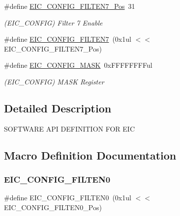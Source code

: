 \begin{DoxyCompactItemize}
\item 
\#define \mbox{\hyperlink{group___s_a_m_d21___e_i_c_ga77bd3664d9f1c1d6b212eac416d40341}{E\+I\+C\+\_\+\+C\+O\+N\+F\+I\+G\+\_\+\+F\+I\+L\+T\+E\+N7\+\_\+\+Pos}}~31
\begin{DoxyCompactList}\small\item\em (E\+I\+C\+\_\+\+C\+O\+N\+F\+IG) Filter 7 Enable \end{DoxyCompactList}\item 
\#define \mbox{\hyperlink{group___s_a_m_d21___e_i_c_gac996c8f278ab9f4af7588a785eef8c04}{E\+I\+C\+\_\+\+C\+O\+N\+F\+I\+G\+\_\+\+F\+I\+L\+T\+E\+N7}}~(0x1ul $<$$<$ E\+I\+C\+\_\+\+C\+O\+N\+F\+I\+G\+\_\+\+F\+I\+L\+T\+E\+N7\+\_\+\+Pos)
\item 
\#define \mbox{\hyperlink{group___s_a_m_d21___e_i_c_ga713278aaffe59a230cb4f7642ee4900e}{E\+I\+C\+\_\+\+C\+O\+N\+F\+I\+G\+\_\+\+M\+A\+SK}}~0x\+F\+F\+F\+F\+F\+F\+F\+Ful
\begin{DoxyCompactList}\small\item\em (E\+I\+C\+\_\+\+C\+O\+N\+F\+IG) M\+A\+SK Register \end{DoxyCompactList}\end{DoxyCompactItemize}


\subsection{Detailed Description}
S\+O\+F\+T\+W\+A\+RE A\+PI D\+E\+F\+I\+N\+I\+T\+I\+ON F\+OR E\+IC 

\subsection{Macro Definition Documentation}
\mbox{\label{group___s_a_m_d21___e_i_c_gaf3dda3c75f2f02a4d4c532526cc29230}} 
\subsubsection{\texorpdfstring{EIC\_CONFIG\_FILTEN0}{EIC\_CONFIG\_FILTEN0}}
{\footnotesize\ttfamily \#define E\+I\+C\+\_\+\+C\+O\+N\+F\+I\+G\+\_\+\+F\+I\+L\+T\+E\+N0~(0x1ul $<$$<$ E\+I\+C\+\_\+\+C\+O\+N\+F\+I\+G\+\_\+\+F\+I\+L\+T\+E\+N0\+\_\+\+Pos)}

\mbox{\label{group___s_a_m_d21___e_i_c_gaa17527a9aab80477ff20ed73d2d7177a}} 
